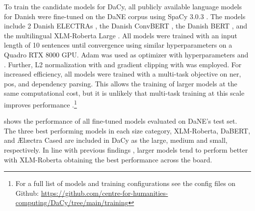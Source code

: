\documentclass{article}
\begin{document}
To train the candidate models for DaCy, all publicly available language models for Danish were fine-tuned on the DaNE corpus \parencite{hvingelby_dane_2020} using SpaCy 3.0.3 \parencite{honnibal_spacy_2020}. The models include 2 Danish ELECTRAs \parencite{clark_electra_2020, hojmark-bertelsen_aelaectra_2021, tamini-sarnikowski_danish_2020}, the Danish ConvBERT \parencite{jiang_convbert_2021, tamini-sarnikowski_danish_2020}, the Danish BERT \parencite{devlin_bert_2019, mollerhoj_danish_2019}, and the multilingual XLM-Roberta Large \parencite{conneau_unsupervised_2020}. All models were trained with an input length of 10 sentences until convergence using similar hyperparameters on a Quadro RTX 8000 GPU. Adam was used as optimizer with hyperparameters  and . Further, L2 normalization with  and gradient clipping with  was employed. For increased efficiency, all models were trained with a multi-task objective \parencite{caruana_multitask_1997, ruder_overview_2017} on  \gls{ner}, \gls{pos}, and dependency parsing. This allows the training of larger models at the same computational cost, but it is unlikely that multi-task training at this scale improves performance \parencite{raffel_exploring_2020, aghajanyan_muppet_2021}.\footnote{For a full list of models and training configurations see the config files on Github: \url{https://github.com/centre-for-humanities-computing/DaCy/tree/main/training}}

 shows the performance of all fine-tuned models evaluated on DaNE's test set. The three best performing models in each size category, XLM-Roberta, DaBERT, and Ælæctra Cased are included in DaCy as the large, medium and small, respectively. In line with previous findings \parencite{raffel_exploring_2020, brown_language_2020, radford_language_2019}, larger models tend to perform better with XLM-Roberta obtaining the best performance across the board. 
\end{document}
